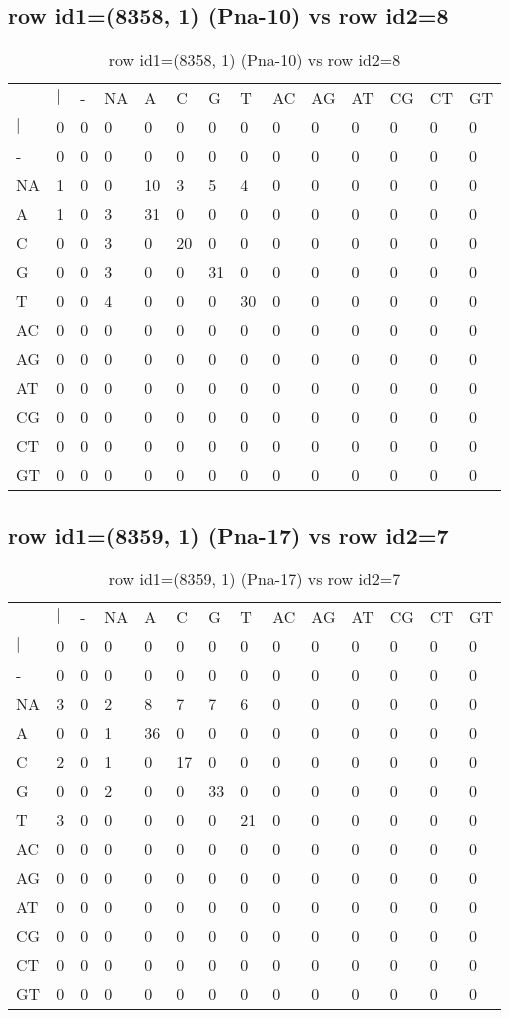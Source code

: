 \subsection{row id1=(8358, 1) (Pna-10) vs row id2=8}
\begin{center}
\begin{longtable}{|l|l|l|l|l|l|l|l|l|l|l|l|l|l|}
\caption{row id1=(8358, 1) (Pna-10) vs row id2=8} \label{table_dm582}\\
\hline
\\
\hline
&$|$&-&NA&A&C&G&T&AC&AG&AT&CG&CT&GT\\
$|$&0&0&0&0&0&0&0&0&0&0&0&0&0\\
-&0&0&0&0&0&0&0&0&0&0&0&0&0\\
NA&1&0&0&10&3&5&4&0&0&0&0&0&0\\
A&1&0&3&31&0&0&0&0&0&0&0&0&0\\
C&0&0&3&0&20&0&0&0&0&0&0&0&0\\
G&0&0&3&0&0&31&0&0&0&0&0&0&0\\
T&0&0&4&0&0&0&30&0&0&0&0&0&0\\
AC&0&0&0&0&0&0&0&0&0&0&0&0&0\\
AG&0&0&0&0&0&0&0&0&0&0&0&0&0\\
AT&0&0&0&0&0&0&0&0&0&0&0&0&0\\
CG&0&0&0&0&0&0&0&0&0&0&0&0&0\\
CT&0&0&0&0&0&0&0&0&0&0&0&0&0\\
GT&0&0&0&0&0&0&0&0&0&0&0&0&0\\
\hline
\end{longtable}
\end{center}

\subsection{row id1=(8359, 1) (Pna-17) vs row id2=7}
\begin{center}
\begin{longtable}{|l|l|l|l|l|l|l|l|l|l|l|l|l|l|}
\caption{row id1=(8359, 1) (Pna-17) vs row id2=7} \label{table_dm584}\\
\hline
\\
\hline
&$|$&-&NA&A&C&G&T&AC&AG&AT&CG&CT&GT\\
$|$&0&0&0&0&0&0&0&0&0&0&0&0&0\\
-&0&0&0&0&0&0&0&0&0&0&0&0&0\\
NA&3&0&2&8&7&7&6&0&0&0&0&0&0\\
A&0&0&1&36&0&0&0&0&0&0&0&0&0\\
C&2&0&1&0&17&0&0&0&0&0&0&0&0\\
G&0&0&2&0&0&33&0&0&0&0&0&0&0\\
T&3&0&0&0&0&0&21&0&0&0&0&0&0\\
AC&0&0&0&0&0&0&0&0&0&0&0&0&0\\
AG&0&0&0&0&0&0&0&0&0&0&0&0&0\\
AT&0&0&0&0&0&0&0&0&0&0&0&0&0\\
CG&0&0&0&0&0&0&0&0&0&0&0&0&0\\
CT&0&0&0&0&0&0&0&0&0&0&0&0&0\\
GT&0&0&0&0&0&0&0&0&0&0&0&0&0\\
\hline
\end{longtable}
\end{center}

